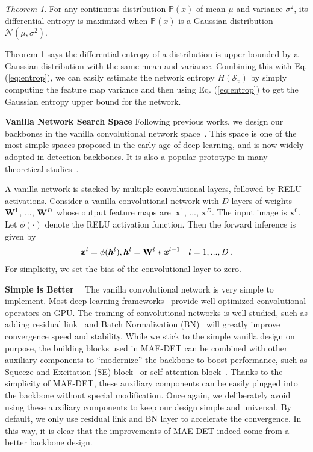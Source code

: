 \documentclass[nohyperref]{article}
\theoremstyle{plain}
\theoremstyle{definition}
\theoremstyle{remark}
\newtheorem{thm}{Theorem}
\begin{document}
\begin{thm}
	\label{thm:gaussian-upper-bound-entropy} For any continuous distribution $\mathbb{P}(x)$ of mean $\mu$ and variance $\sigma^2$, its differential entropy is maximized when $\mathbb{P}(x)$ is a Gaussian distribution $\mathcal{N}(\mu,\sigma^2)$.
\end{thm}

Theorem \ref{thm:gaussian-upper-bound-entropy} says the differential entropy of a distribution is upper bounded by a Gaussian distribution with the same mean and variance. Combining this with Eq. (\ref{eq:entrop}), we can easily estimate the network entropy $H(\mathcal{S}_v)$ by simply computing the feature map variance and then using Eq. (\ref{eq:entrop}) to get the Gaussian entropy upper bound for the network.

\noindent\textbf{Vanilla Network Search Space} Following previous works, we design our backbones in the vanilla convolutional network space~\citep{detnet,detnas,spinenet,zennas}. This space is one of the most simple spaces proposed in the early age of deep learning, and is now widely adopted in detection backbones. It is also a popular prototype in many theoretical studies~\citep{exponential,bounding,complexity}.

A vanilla network is stacked by multiple convolutional layers, followed by RELU activations. Consider a vanilla convolutional network with $D$ layers of weights ${\bf {W}}^1$,  $...$,  ${\bf {W}}^D$ whose output feature maps are $\ {\boldsymbol {x}}^1$, $...$, ${\boldsymbol {x}}^D$. The input image is $\boldsymbol{x}^0$. Let $\phi(\cdot)$ denote the RELU activation function. Then the forward inference is given by
\begin{align}
	{\boldsymbol {x}}^{l} =  \phi({\boldsymbol {h}}^{l}), {\boldsymbol {h}}^{l}={{\bf {W}}^l} * {\boldsymbol {x}}^{l-1} \quad l=1, ..., D \, .
	\label{eq:forward}
\end{align}
For simplicity, we set the bias of the convolutional layer to zero.

\noindent\textbf{Simple is Better}$\quad$ The vanilla convolutional network is very simple to implement. Most deep learning frameworks~\cite{Pytorch_NIPS2019,tensorflow2015-whitepaper} provide well optimized convolutional operators on GPU. The training of convolutional networks is well studied, such as adding residual link~\citep{resnet} and Batch Normalization (BN)~\citep{bn} will greatly improve convergence speed and stability. While we stick to the simple vanilla design on purpose, the building blocks used in MAE-DET can be combined with other auxiliary components to ``modernize'' the backbone to boost performance, such as Squeeze-and-Excitation (SE) block~\citep{hu2018squeeze} or self-attention block~\citep{zhao2020exploring}. Thanks to the simplicity of MAE-DET, these auxiliary components can be easily plugged into the backbone without special modification. Once again, we deliberately avoid using these auxiliary components to keep our design simple and universal. By default, we only use residual link and BN layer to accelerate the convergence. In this way, it is clear that the improvements of MAE-DET indeed come from a better backbone design.
\end{document}
